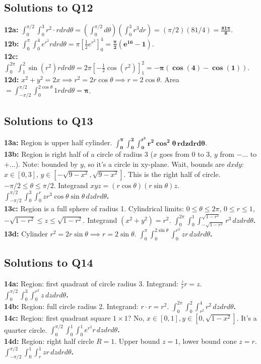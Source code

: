 \documentclass[11pt]{article}
\begin{document}
\subsection{Solutions to Q12}
\textbf{12a:} $\int_0^{\pi/2} \int_0^3 r^2 \cdot r dr d\theta = (\int_0^{\pi/2} d\theta) (\int_0^3 r^3 dr) = (\pi/2)(81/4) = \mathbf{\frac{81\pi}{8}}$.\\
\textbf{12b:} $\int_0^\pi \int_0^4 e^{r^2} r dr d\theta = \pi [\frac{1}{2}e^{r^2}]_0^4 = \mathbf{\frac{\pi}{2}(e^{16} - 1)}$.\\
\textbf{12c:} $\int_0^{2\pi} \int_1^2 \sin(r^2) r dr d\theta = 2\pi [-\frac{1}{2}\cos(r^2)]_1^2 = \mathbf{-\pi(\cos(4) - \cos(1))}$.\\
\textbf{12d:} $x^2+y^2 = 2x \implies r^2 = 2r\cos\theta \implies r = 2\cos\theta$. Area $= \int_{-\pi/2}^{\pi/2} \int_0^{2\cos\theta} 1 r dr d\theta = \mathbf{\pi}$.

\subsection{Solutions to Q13}
\textbf{13a:} Region is upper half cylinder. $\mathbf{\int_0^{\pi} \int_0^2 \int_0^{r^2} r^2\cos^2\theta \, r dz dr d\theta}$.\\
\textbf{13b:} Region is right half of a circle of radius 3 ($x$ goes from 0 to 3, $y$ from $- \dots$ to $+ \dots$). Note: bounded by $y$, so it's a circle in xy-plane. Wait, bounds are $dx dy$: $x \in [0, 3]$, $y \in[-\sqrt{9-x^2}, \sqrt{9-x^2}]$. This is the right half of circle. $-\pi/2 \le \theta \le \pi/2$. Integrand $xyz = (r\cos\theta)(r\sin\theta)z$. \textbf{$\int_{-\pi/2}^{\pi/2} \int_0^3 \int_0^r z r^3 \cos\theta \sin\theta \, dz dr d\theta$.}\\
\textbf{13c:} Region is a full sphere of radius 1. Cylindrical limits: $0 \le \theta \le 2\pi$, $0 \le r \le 1$, $-\sqrt{1-r^2} \le z \le \sqrt{1-r^2}$. Integrand $(x^2+y^2) = r^2$. \textbf{$\int_0^{2\pi} \int_0^1 \int_{-\sqrt{1-r^2}}^{\sqrt{1-r^2}} r^3 \, dz dr d\theta$.}\\
\textbf{13d:} Cylinder $r^2 = 2r\sin\theta \implies r = 2\sin\theta$. \textbf{$\int_0^{\pi} \int_0^{2\sin\theta} \int_0^{r^2} z r \, dz dr d\theta$.}

\subsection{Solutions to Q14}
\textbf{14a:} Region: first quadrant of circle radius 3. Integrand: $\frac{z}{r} r = z$. \textbf{$\int_0^{\pi/2} \int_0^3 \int_0^{r^2} z \, dz dr d\theta$.}\\
\textbf{14b:} Region: full circle radius 2. Integrand: $r \cdot r = r^2$. \textbf{$\int_0^{2\pi} \int_0^2 \int_{r^2}^4 r^2 \, dz dr d\theta$.}\\
\textbf{14c:} Region: first quadrant square $1 \times 1$? No, $x \in [0,1], y \in [0, \sqrt{1-x^2}]$. It's a quarter circle. \textbf{$\int_0^{\pi/2} \int_0^1 \int_0^1 e^{r^2} r \, dz dr d\theta$.}\\
\textbf{14d:} Region: right half circle $R=1$. Upper bound $z=1$, lower bound cone $z=r$. \textbf{$\int_{-\pi/2}^{\pi/2} \int_0^1 \int_r^1 z r \, dz dr d\theta$.}
\end{document}
